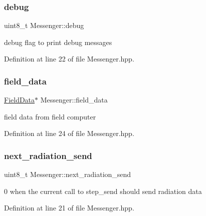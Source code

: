 \subsubsection{\texorpdfstring{debug}{debug}}
{\footnotesize\ttfamily uint8\+\_\+t Messenger\+::debug\hspace{0.3cm}{\ttfamily [private]}}



debug flag to print debug messages 



Definition at line 22 of file Messenger.\+hpp.

\mbox{\label{class_messenger_a8e4a16dc0dcfa44af9030a9ad8f69fa2}} 
\subsubsection{\texorpdfstring{field\+\_\+data}{field\_data}}
{\footnotesize\ttfamily \hyperlink{class_field_data}{Field\+Data}$\ast$ Messenger\+::field\+\_\+data\hspace{0.3cm}{\ttfamily [private]}}



field data from field computer 



Definition at line 24 of file Messenger.\+hpp.

\mbox{\label{class_messenger_a4da89e69daa6684d63fa02ff64886fe6}} 
\subsubsection{\texorpdfstring{next\+\_\+radiation\+\_\+send}{next\_radiation\_send}}
{\footnotesize\ttfamily uint8\+\_\+t Messenger\+::next\+\_\+radiation\+\_\+send\hspace{0.3cm}{\ttfamily [private]}}



0 when the current call to step\+\_\+send should send radiation data 



Definition at line 21 of file Messenger.\+hpp.

